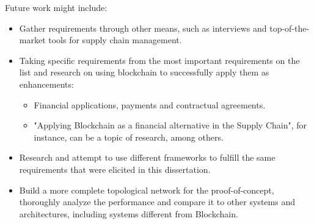 Future work might include:
\begin{itemize}
	\item Gather requirements through other means, such as interviews and top-of-the-market tools for supply chain management.
	\item Taking specific requirements from the most important requirements on the list and research on using blockchain to successfully apply them as enhancements:
	\begin{itemize}
		\item Financial applications, payments and contractual agreements.
		\item "Applying Blockchain as a financial alternative in the Supply Chain", for instance, can be a topic of research, among others.
	\end{itemize}
	\item Research and attempt to use different frameworks to fulfill the same requirements that were elicited in this dissertation.
	\item Build a more complete topological network for the proof-of-concept, thoroughly analyze the performance and compare it to other systems and architectures, including systems different from Blockchain.
	
\end{itemize} 


%

